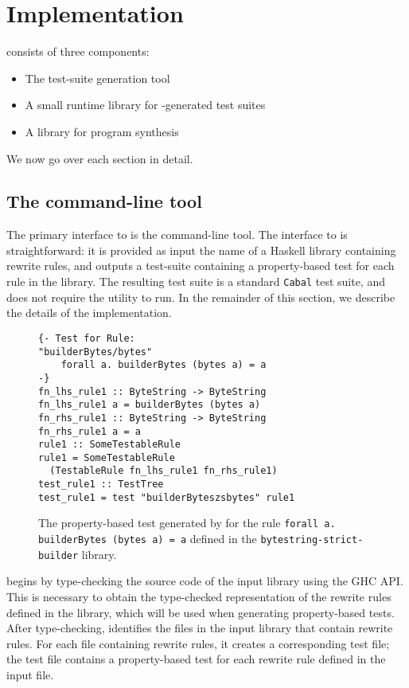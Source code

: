 \section{Implementation}
\label{sec:implementation}

\Rulecheck consists of three components:

\begin{itemize}
  \item The \rctool test-suite generation tool
  \item A small runtime library for \rctool-generated test suites
  \item A library for program synthesis
\end{itemize}

We now go over each section in detail.

\subsection{The \rctool command-line tool}\label{sec:implementation:testgen}

The primary interface to \Rulecheck is the \rctool command-line tool. The
interface to \rctool is straightforward: it is provided as input the name of a
Haskell library containing rewrite rules, and outputs a test-suite containing a
property-based test for each rule in the library. The resulting test suite is a
standard \texttt{Cabal} test suite, and does not require the \rctool utility to
run. In the remainder of this section, we describe the details of the \rctool
implementation.

\begin{figure}
  \begin{verbatim}
{- Test for Rule:
"builderBytes/bytes"
    forall a. builderBytes (bytes a) = a
-}
fn_lhs_rule1 :: ByteString -> ByteString
fn_lhs_rule1 a = builderBytes (bytes a)
fn_rhs_rule1 :: ByteString -> ByteString
fn_rhs_rule1 a = a
rule1 :: SomeTestableRule
rule1 = SomeTestableRule
  (TestableRule fn_lhs_rule1 fn_rhs_rule1)
test_rule1 :: TestTree
test_rule1 = test "builderByteszsbytes" rule1
   \end{verbatim}
   \caption{The property-based test generated by \rctool for the rule \texttt{forall a.
builderBytes (bytes a) = a} defined in the \texttt{bytestring-strict-builder}
library.}
    \label{fig:implementation:ruletest}
\end{figure}

\rctool begins by type-checking the source code of the input library using the
GHC API. This is necessary to obtain the type-checked representation of the
rewrite rules defined in the library, which will be used when generating
property-based tests. After type-checking, \rctool identifies the files in the
input library that contain rewrite rules. For each file containing rewrite
rules, it creates a corresponding test file; the test file contains a
property-based test for each rewrite rule defined in the input file.


